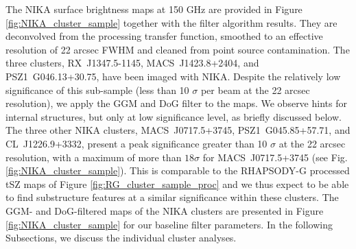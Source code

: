 \documentclass[traditabstract]{aa}
\begin{document}
The NIKA surface brightness maps at 150 GHz are provided in Figure \ref{fig:NIKA_cluster_sample} together with the filter algorithm results. They are deconvolved from the processing transfer function, smoothed to an effective resolution of 22 arcsec FWHM and cleaned from point source contamination. The three clusters, \mbox{RX~J1347.5-1145}, \mbox{MACS~J1423.8+2404,} and \mbox{PSZ1~G046.13+30.75,} have been imaged with NIKA. Despite the relatively low significance of this sub-sample (less than 10 $\sigma$ per beam at the 22 arcsec resolution), we apply the GGM and DoG filter to the maps. We observe hints for internal structures, but only at low significance level, as briefly discussed below. The three other NIKA clusters, \mbox{MACS~J0717.5+3745}, \mbox{PSZ1~G045.85+57.71,} and \mbox{CL~J1226.9+3332}, present a peak significance greater than 10 $\sigma$ at the 22 arcsec resolution, with a maximum of more than $18 \sigma$ for \mbox{MACS~J0717.5+3745} (see Fig. \ref{fig:NIKA_cluster_sample}). This is comparable to the RHAPSODY-G processed tSZ maps of Figure \ref{fig:RG_cluster_sample_proc} and we thus expect to be able to find substructure features at a similar significance within these clusters. The GGM- and DoG-filtered maps of the NIKA clusters are presented in Figure \ref{fig:NIKA_cluster_sample} for our baseline filter parameters. In the following Subsections, we discuss the individual cluster analyses.

\end{document}
